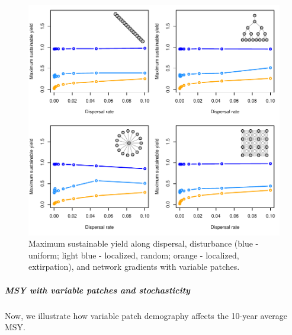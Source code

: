\documentclass[]{article}
\let\oldsubparagraph\subparagraph
\renewcommand{\subparagraph}[1]{\oldsubparagraph{#1}\mbox{}}
\begin{document}
\begin{figure}[H]

{\centering \includegraphics{Managing_for_ecological_surprises_in_metapopulations_makeHTML_files/figure-latex/MSY with variable patches-1} 

}

\caption{Maximum sustainable yield along dispersal, disturbance (blue - uniform; light blue - localized, random; orange - localized, extirpation), and network gradients with variable patches.}\label{fig:MSY with variable patches}
\end{figure}

\subparagraph{MSY with variable patches and
stochasticity}\label{msy-with-variable-patches-and-stochasticity}

Now, we illustrate how variable patch demography affects the 10-year
average MSY.
\end{document}
